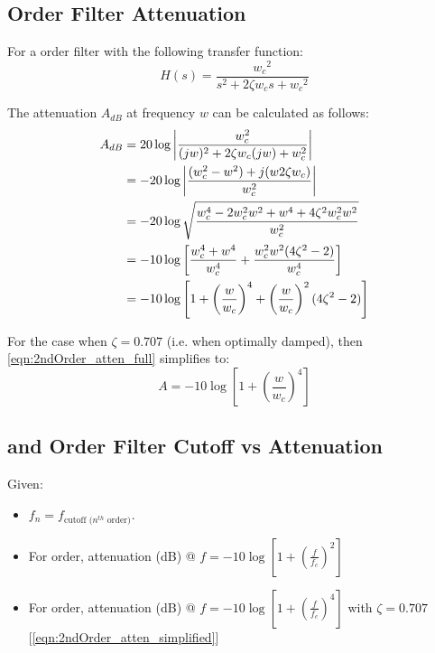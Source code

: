 \subsection{ Order Filter Attenuation}

For a  order filter with the following transfer function:
$$H(s) = \frac{{w_c}^2}{s^2 + 2 \zeta w_c s + {w_c}^2}$$

\noindent The attenuation $A_{dB}$ at frequency $w$ can be calculated as follows:
\begin{align}
    A_{dB} & = 20 \log \left\lvert\frac{w_c^2}{(jw)^2 + 2 \zeta w_c (jw) + w_c^2} \right\rvert                  \notag                                  \\
           & = -20 \log \left\lvert \frac{(w_c^2 - w^2) + j(w 2 \zeta w_c)}{w_c^2} \right\rvert                 \notag                                  \\
           & = -20 \log \sqrt{\frac{w_c ^ 4 - 2 w_c^2 w^2 + w^4 + 4 \zeta ^2 w_c^2 w^2}{w_c^2}}                 \notag                                  \\
           & = -10 \log \left[ \frac{w_c^4 + w^4}{w_c^4} + \frac{w_c^2 w^2 (4 \zeta ^2 - 2)}{w_c^4} \right]     \notag                                  \\
           & = -10 \log \left[ 1 + \left(\frac{w}{w_c}\right)^4 + \left(\frac{w}{w_c}\right)^2 (4 \zeta ^2 - 2) \right] \label{eqn:2ndOrder_atten_full}
\end{align}

For the case when $\zeta = 0.707$ (i.e. when optimally damped), then \ref{eqn:2ndOrder_atten_full} simplifies to:
\begin{equation}
    A = -10 \log \left[1 + \left( \frac{w}{w_c} \right)^4\right] \label{eqn:2ndOrder_atten_simplified}
\end{equation}

\subsection{ and  Order Filter Cutoff vs Attenuation}

Given:
\begin{itemize}
    \item $f_n = f_{\text{cutoff ($n^{th}$ order)}}$.
    \item For  order, attenuation (dB) @ ${f} = -10\log[1 + (\frac{f}{f_{c}})^{2}]$ \cite{pwmAnalogConversion}
    \item For  order, attenuation (dB) @ ${f} = -10\log [1+(\frac{f}{f_c})^4]$ with $\zeta = 0.707$ [\ref{eqn:2ndOrder_atten_simplified}]
\end{itemize}


